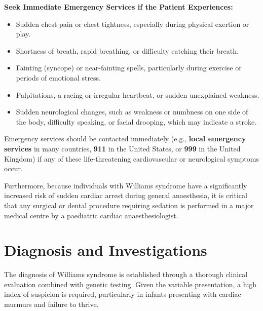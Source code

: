 \textbf{Seek Immediate Emergency Services if the Patient Experiences:}
\begin{itemize}
    \item Sudden chest pain or chest tightness, especially during physical exertion or play.
    \item Shortness of breath, rapid breathing, or difficulty catching their breath.
    \item Fainting (syncope) or near-fainting spells, particularly during exercise or periods of emotional stress.
    \item Palpitations, a racing or irregular heartbeat, or sudden unexplained weakness.
    \item Sudden neurological changes, such as weakness or numbness on one side of the body, difficulty speaking, or facial drooping, which may indicate a stroke.
\end{itemize}
Emergency services should be contacted immediately (e.g., \textbf{local emergency services} in many countries, \textbf{911} in the United States, or \textbf{999} in the United Kingdom) if any of these life-threatening cardiovascular or neurological symptoms occur.

Furthermore, because individuals with Williams syndrome have a significantly increased risk of sudden cardiac arrest during general anaesthesia, it is critical that any surgical or dental procedure requiring sedation is performed in a major medical centre by a paediatric cardiac anaesthesiologist.

\section*{Diagnosis and Investigations}
The diagnosis of Williams syndrome is established through a thorough clinical evaluation combined with genetic testing. Given the variable presentation, a high index of suspicion is required, particularly in infants presenting with cardiac murmurs and failure to thrive.

